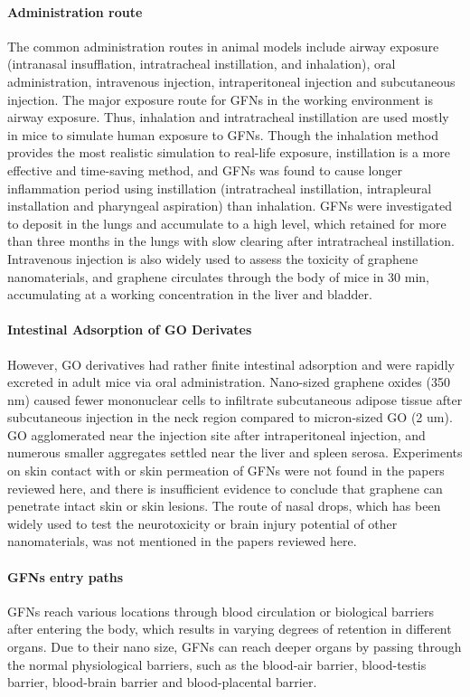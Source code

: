\documentclass[twoside,twocolumn,9pt]{article}
\begin{document}
\paragraph{Administration route} The common administration routes in animal models include airway exposure (intranasal insufflation, intratracheal instillation, and inhalation), oral administration, intravenous injection, intraperitoneal injection and subcutaneous injection. The major exposure route for GFNs in the working environment is airway exposure. Thus, inhalation and intratracheal instillation are used mostly in mice to simulate human exposure to GFNs. Though the inhalation method provides the most realistic simulation to real-life exposure, instillation is a more effective and time-saving method, and GFNs was found to cause longer inflammation period using instillation (intratracheal instillation, intrapleural installation and pharyngeal aspiration) than inhalation. GFNs were investigated to deposit in the lungs and accumulate to a high level, which retained for more than three months in the lungs with slow clearing after intratracheal instillation. Intravenous injection is also widely used to assess the toxicity of graphene nanomaterials, and graphene circulates through the body of mice in 30 min, accumulating at a working concentration in the liver and bladder.

\paragraph{Intestinal Adsorption of GO Derivates} However, GO derivatives had rather finite intestinal adsorption and were rapidly excreted in adult mice via oral administration. Nano-sized graphene oxides (350 nm) caused fewer mononuclear cells to infiltrate subcutaneous adipose tissue after subcutaneous injection in the neck region compared to micron-sized GO (2 um). GO agglomerated near the injection site after intraperitoneal injection, and numerous smaller aggregates settled near the liver and spleen serosa. Experiments on skin contact with or skin permeation of GFNs were not found in the papers reviewed here, and there is insufficient evidence to conclude that graphene can penetrate intact skin or skin lesions. The route of nasal drops, which has been widely used to test the neurotoxicity or brain injury potential of other nanomaterials, was not mentioned in the papers reviewed here.

\paragraph{GFNs entry paths} GFNs reach various locations through blood circulation or biological barriers after entering the body, which results in varying degrees of retention in different organs. Due to their nano size, GFNs can reach deeper organs by passing through the normal physiological barriers, such as the blood-air barrier, blood-testis barrier, blood-brain barrier and blood-placental barrier.
\end{document}
